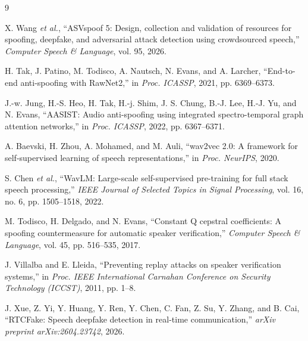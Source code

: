 \documentclass[conference]{IEEEtran}
\begin{document}
\begin{thebibliography}{9}

X. Wang \emph{et al.}, ``ASVspoof 5: Design, collection and validation of resources for spoofing, deepfake, and adversarial attack detection using crowdsourced speech,'' \emph{Computer Speech \& Language}, vol. 95, 2026.

H. Tak, J. Patino, M. Todisco, A. Nautsch, N. Evans, and A. Larcher, ``End-to-end anti-spoofing with RawNet2,'' in \emph{Proc. ICASSP}, 2021, pp. 6369--6373.

J.-w. Jung, H.-S. Heo, H. Tak, H.-j. Shim, J. S. Chung, B.-J. Lee, H.-J. Yu, and N. Evans, ``AASIST: Audio anti-spoofing using integrated spectro-temporal graph attention networks,'' in \emph{Proc. ICASSP}, 2022, pp. 6367--6371.

A. Baevski, H. Zhou, A. Mohamed, and M. Auli, ``wav2vec 2.0: A framework for self-supervised learning of speech representations,'' in \emph{Proc. NeurIPS}, 2020.

S. Chen \emph{et al.}, ``WavLM: Large-scale self-supervised pre-training for full stack speech processing,'' \emph{IEEE Journal of Selected Topics in Signal Processing}, vol. 16, no. 6, pp. 1505--1518, 2022.

M. Todisco, H. Delgado, and N. Evans, ``Constant Q cepstral coefficients: A spoofing countermeasure for automatic speaker verification,'' \emph{Computer Speech \& Language}, vol. 45, pp. 516--535, 2017.

J. Villalba and E. Lleida, ``Preventing replay attacks on speaker verification systems,'' in \emph{Proc. IEEE International Carnahan Conference on Security Technology (ICCST)}, 2011, pp. 1--8.

J. Xue, Z. Yi, Y. Huang, Y. Ren, Y. Chen, C. Fan, Z. Su, Y. Zhang, and B. Cai, ``RTCFake: Speech deepfake detection in real-time communication,'' \emph{arXiv preprint arXiv:2604.23742}, 2026.

\end{thebibliography}
\end{document}
